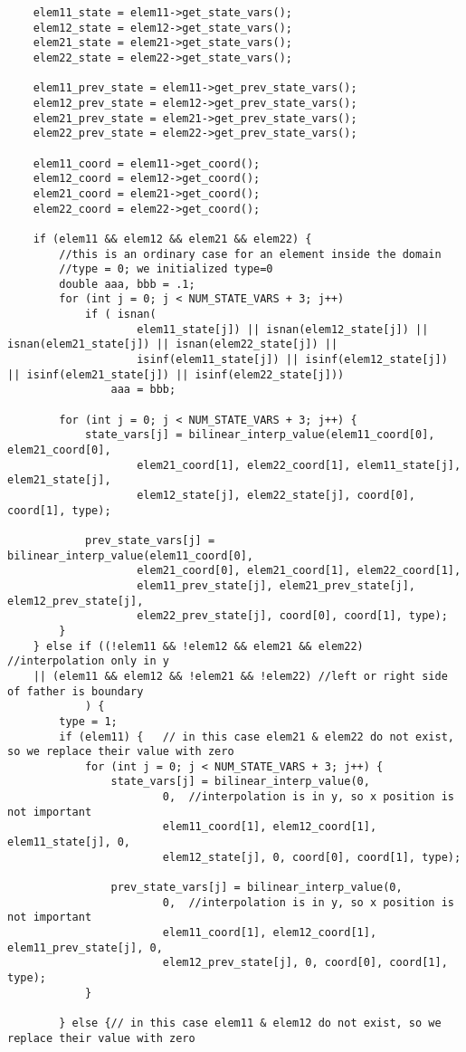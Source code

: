 \documentclass[a4paper,10pt]{article}
\begin{document}
\begin{lstlisting}
	elem11_state = elem11->get_state_vars();
	elem12_state = elem12->get_state_vars();
	elem21_state = elem21->get_state_vars();
	elem22_state = elem22->get_state_vars();

	elem11_prev_state = elem11->get_prev_state_vars();
	elem12_prev_state = elem12->get_prev_state_vars();
	elem21_prev_state = elem21->get_prev_state_vars();
	elem22_prev_state = elem22->get_prev_state_vars();

	elem11_coord = elem11->get_coord();
	elem12_coord = elem12->get_coord();
	elem21_coord = elem21->get_coord();
	elem22_coord = elem22->get_coord();

	if (elem11 && elem12 && elem21 && elem22) {
		//this is an ordinary case for an element inside the domain
		//type = 0; we initialized type=0
		double aaa, bbb = .1;
		for (int j = 0; j < NUM_STATE_VARS + 3; j++)
			if ( isnan(
					elem11_state[j]) || isnan(elem12_state[j]) || isnan(elem21_state[j]) || isnan(elem22_state[j]) ||
					isinf(elem11_state[j]) || isinf(elem12_state[j]) || isinf(elem21_state[j]) || isinf(elem22_state[j]))
				aaa = bbb;

		for (int j = 0; j < NUM_STATE_VARS + 3; j++) {
			state_vars[j] = bilinear_interp_value(elem11_coord[0], elem21_coord[0],
					elem21_coord[1], elem22_coord[1], elem11_state[j], elem21_state[j],
					elem12_state[j], elem22_state[j], coord[0], coord[1], type);

			prev_state_vars[j] = bilinear_interp_value(elem11_coord[0],
					elem21_coord[0], elem21_coord[1], elem22_coord[1],
					elem11_prev_state[j], elem21_prev_state[j], elem12_prev_state[j],
					elem22_prev_state[j], coord[0], coord[1], type);
		}
	} else if ((!elem11 && !elem12 && elem21 && elem22)	//interpolation only in y
	|| (elem11 && elem12 && !elem21 && !elem22)	//left or right side of father is boundary
			) {
		type = 1;
		if (elem11) {	// in this case elem21 & elem22 do not exist, so we replace their value with zero
			for (int j = 0; j < NUM_STATE_VARS + 3; j++) {
				state_vars[j] = bilinear_interp_value(0,
						0,	//interpolation is in y, so x position is not important
						elem11_coord[1], elem12_coord[1], elem11_state[j], 0,
						elem12_state[j], 0, coord[0], coord[1], type);

				prev_state_vars[j] = bilinear_interp_value(0,
						0,	//interpolation is in y, so x position is not important
						elem11_coord[1], elem12_coord[1], elem11_prev_state[j], 0,
						elem12_prev_state[j], 0, coord[0], coord[1], type);
			}

		} else {// in this case elem11 & elem12 do not exist, so we replace their value with zero


\end{lstlisting}
\end{document}
